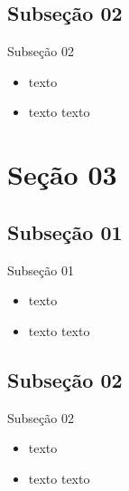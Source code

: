 \documentclass{sintefbeamer}
\begin{document}
\subsection[]{Subseção 02}

\begin{frame}{Subseção 02}
	\begin{itemize}[<+->]
		\item texto
		
		\item texto texto
	\end{itemize}
\end{frame}



\section{Seção 03}

\subsection[]{Subseção 01}

\begin{frame}{Subseção 01}
	\begin{itemize}[<+->]
		\item texto
		
		\item texto texto
	\end{itemize}
\end{frame}


\subsection[]{Subseção 02}

\begin{frame}{Subseção 02}
	\begin{itemize}[<+->]
		\item texto
		
		\item texto texto
	\end{itemize}
\end{frame}



\bibliographpage



\backmatter
\end{document}
